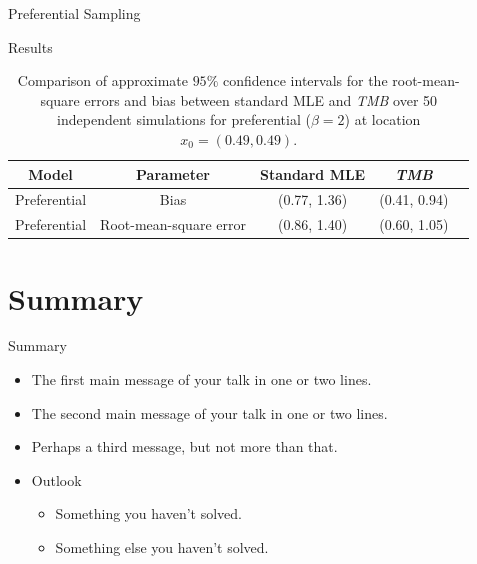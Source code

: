 \documentclass{beamer}
\begin{document}
\begin{frame}{Preferential Sampling}
\begin{block}{Results}
\small
\begin{table}[ht]
\centering
    \begin{tabular}{| c | c | c | c | c |}
    \hline
    Model & Parameter  & Standard MLE & {\it TMB} \\ \hline
    Preferential & Bias & (0.77, 1.36)  & (0.41, 0.94) \\
    Preferential & Root-mean-square error & (0.86, 1.40) & (0.60, 1.05)  \\ \hline
\end{tabular}
    \caption {Comparison of approximate $95\%$ confidence intervals for the root-mean-square errors and bias between standard MLE and {\it TMB} over 50 independent simulations for preferential ($\beta=2$) at location $x_0=(0.49, 0.49)$.}
 \label{table:simtable}
\end{table}
\normalsize
\end{block}

\end{frame}
\section*{Summary}

\begin{frame}{Summary}
  \begin{itemize}
  \item
    The \alert{first main message} of your talk in one or two lines.
  \item
    The \alert{second main message} of your talk in one or two lines.
  \item
    Perhaps a \alert{third message}, but not more than that.
  \end{itemize}
  
  \begin{itemize}
  \item
    Outlook
    \begin{itemize}
    \item
      Something you haven't solved.
    \item
      Something else you haven't solved.
    \end{itemize}
  \end{itemize}
\end{frame}
\end{document}
